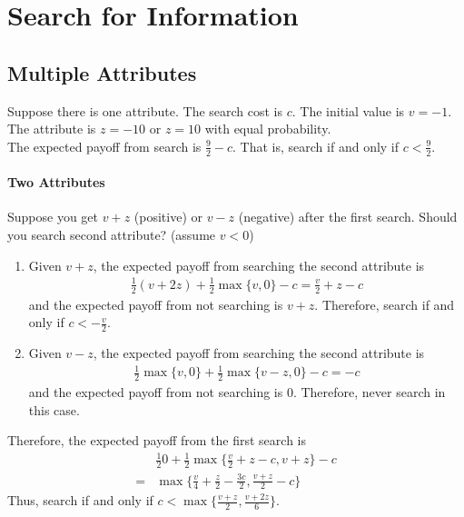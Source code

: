 \documentclass[11pt]{elegantbook}
\begin{document}
\section{Search for Information}
\subsection{Multiple Attributes}
\begin{example}
    Suppose there is one attribute. The search cost is $c$. The initial value is $v=-1$. The attribute is $z=-10$ or $z=10$ with equal probability.\\
    The expected payoff from search is $\frac{9}{2}-c$. That is, search if and only if $c<\frac{9}{2}$.
\end{example}

\paragraph*{Two Attributes}
Suppose you get $v+z$ (positive) or $v-z$ (negative) after the first search. Should you search second attribute? (assume $v<0$)
\begin{enumerate}
    \item Given $v+z$, the expected payoff from searching the second attribute is
    \begin{equation}
        \begin{aligned}
            \frac{1}{2}\left(v+2z\right)+\frac{1}{2}\max\{v,0\}-c=\frac{v}{2}+z-c
        \end{aligned}
        \nonumber
    \end{equation}
    and the expected payoff from not searching is $v+z$. Therefore, search if and only if $c<-\frac{v}{2}$.
    \item Given $v-z$, the expected payoff from searching the second attribute is
    \begin{equation}
        \begin{aligned}
            \frac{1}{2}\max\{v,0\}+\frac{1}{2}\max\{v-z,0\}-c=-c
        \end{aligned}
        \nonumber
    \end{equation}
    and the expected payoff from not searching is $0$. Therefore, never search in this case.
\end{enumerate}
Therefore, the expected payoff from the first search is
\begin{equation}
    \begin{aligned}
        &\frac{1}{2}0+\frac{1}{2}\max\{\frac{v}{2}+z-c,v+z\}-c\\
        =&\max\{\frac{v}{4}+\frac{z}{2}-\frac{3c}{2},\frac{v+z}{2}-c\}
    \end{aligned}
    \nonumber
\end{equation}
Thus, search if and only if $c<\max\{\frac{v+z}{2},\frac{v+2z}{6}\}$.
\end{document}
